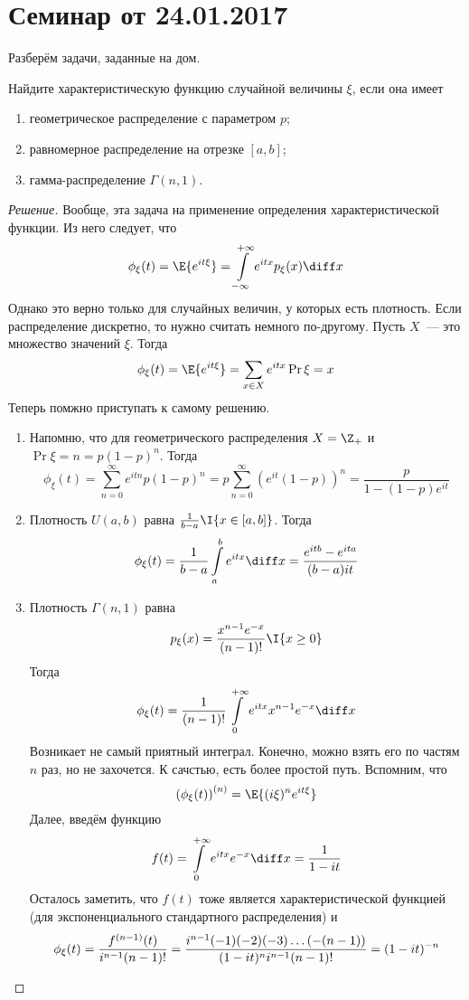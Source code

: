 \section{Семинар от 24.01.2017}
Разберём задачи, заданные на дом.
\begin{problem}
	Найдите характеристическую функцию случайной величины \(\xi\), если она 
	имеет
	\begin{enumerate}[label=(\alph*)]
		\item геометрическое распределение с параметром \(p\);
		\item равномерное распределение на отрезке \([a, b]\);
		\item гамма-распределение \(\Gamma(n, 1)\).
	\end{enumerate}
\end{problem}
\begin{proof}[Решение]
	Вообще, эта задача на применение определения характеристической функции. Из 
	него следует, что
	\[
	\phi_{\xi}(t) = \E{e^{it\xi}} = \int\limits_{-\infty}^{+\infty} 
	e^{itx}p_{\xi}(x)\diff x
	\]
	Однако это верно только для случайных величин, у которых есть плотность. 
	Если распределение дискретно, то нужно считать немного по-другому. Пусть 
	\(X\)~--- это множество значений \(\xi\). Тогда
	\[
	\phi_{\xi}(t) = \E{e^{it\xi}} = \sum_{x \in X} e^{itx}\Pr{\xi = x}
	\]
	Теперь помжно приступать к самому решению.
	\begin{enumerate}[label=(\alph*)]
		\item Напомню, что для геометрического распределения \(X = \Z_+\) и 
		\(\Pr{\xi = n} = p(1 - p)^n\). Тогда
		\[
		\phi_{\xi}(t) = \sum_{n = 0}^{\infty} e^{itn}p(1 - p)^n = p\sum_{n = 
		0}^{\infty} \left(e^{it}(1 - p)\right)^n = \frac{p}{1 - (1 - p)e^{it}}
		\]
		\item Плотность \(U(a, b)\) равна \(\frac{1}{b - a}\I\{x \in [a, 
		b]\}\). Тогда
		\[
		\phi_{\xi}(t) = \frac{1}{b - a}\int\limits_{a}^{b} e^{itx}\diff x = 
		\frac{e^{itb} - e^{ita}}{(b - a)it}
		\]
		\item Плотность \(\Gamma(n, 1)\) равна
		\[
		p_{\xi}(x) = \frac{x^{n - 1}e^{-x}}{(n - 1)!}\I\{x \geq 0\}
		\]
		Тогда
		\[
		\phi_{\xi}(t) = \frac{1}{(n - 1)!}\int\limits_{0}^{+\infty} e^{itx}x^{n 
		- 1}e^{-x}\diff x
		\]
		Возникает не самый приятный интеграл. Конечно, можно взять его по 
		частям \(n\) раз, но не захочется. К сачстью, есть более простой путь.
		Вспомним, что
		\[
		\left(\phi_{\xi}(t)\right)^{(n)} = \E{(i\xi)^ne^{it\xi}}
		\]
		Далее, введём функцию
		\[
		f(t) = \int\limits_{0}^{+\infty} e^{itx}e^{-x}\diff x = \frac{1}{1 - it}
		\]
		Осталось заметить, что \(f(t)\) тоже является характеристической 
		функцией (для экспоненциального стандартного распределения) и
		\[
		\phi_{\xi}(t) = \frac{f^{(n - 1)}(t)}{i^{n - 1}(n - 1)!} = \frac{i^{n - 
		1}(-1)(-2)(-3)\dots(-(n - 1))}{(1 - it)^{n}i^{n - 1}(n - 1)!} = (1 - 
		it)^{-n}\qedhere
		\]
	\end{enumerate}
\end{proof}

